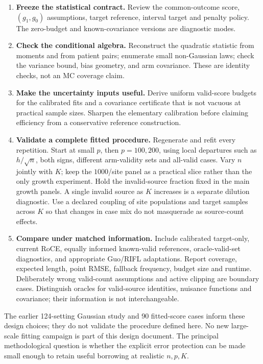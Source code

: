 \begin{enumerate}
\item \textbf{Freeze the statistical contract.} Review the common-outcome
score, $(g_1,g_0)$ assumptions, target reference, interval target and penalty
policy. The zero-budget and known-covariance versions are diagnostic modes.
\item \textbf{Check the conditional algebra.} Reconstruct the quadratic
statistic from moments and from patient pairs; enumerate small non-Gaussian
laws; check the variance bound, bias geometry, and arm covariance. These are
identity checks, not an MC coverage claim.
\item \textbf{Make the uncertainty inputs useful.} Derive uniform valid-score
budgets for the calibrated fits and a covariance certificate that is not
vacuous at practical sample sizes. Sharpen the elementary calibration before
claiming efficiency from a conservative reference construction.
\item \textbf{Validate a complete fitted procedure.} Regenerate and refit
every repetition. Start at small $p$, then $p=100,200$, using local departures
such as $h/\sqrt n$, both signs, different arm-validity sets and all-valid
cases. Vary $n$ jointly with $K$; keep the $1000$/site panel as a practical
slice rather than the only growth experiment.
Hold the invalid-source fraction fixed in the main growth panels. A single
invalid source as $K$ increases is a separate dilution diagnostic. Use a
declared coupling of site populations and target samples across $K$ so that
changes in case mix do not masquerade as source-count effects.
\item \textbf{Compare under matched information.} Include calibrated target-only,
current RoCE, equally informed known-valid references, oracle-valid-set
diagnostics, and appropriate Guo/RIFL adaptations. Report coverage, expected
length, point RMSE, fallback frequency, budget size and runtime. Deliberately
wrong valid-count assumptions and active clipping are boundary cases.
Distinguish oracles for valid-source identities, nuisance functions and
covariance; their information is not interchangeable.
\end{enumerate}

The earlier 124-setting Gaussian study and 90 fitted-score cases inform these
design choices; they do not validate the procedure defined here. No new
large-scale fitting campaign is part of this design document. The principal
methodological question is whether the explicit error protection can be made
small enough to retain useful borrowing at realistic $n,p,K$.

